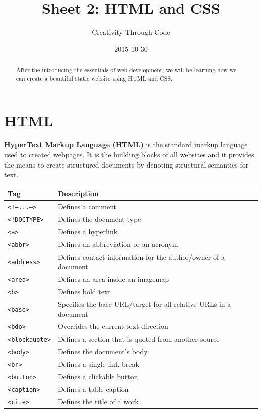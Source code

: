 \documentclass[11pt, letterpaper]{article}
\title{Sheet 2: HTML and CSS}
\date{2015-10-30}
\author{Creativity Through Code}
\begin{document}
	\maketitle
	\newpage
	\begin{abstract}
		After the introducing the essentials of web development, we will be learning how we can create a beautiful static website using HTML and CSS.
	\end{abstract}
	\section{HTML}
		\textbf{HyperText Markup Language (HTML)} is the standard markup language used to created webpages. It is the building blocks of all websites and it provides the means to create structured documents by denoting structural semantics for text.
		\begin{longtable}{l l}
			\toprule
			Tag & Description \\\midrule
			\texttt{<!---...--->} & Defines a comment \\\midrule
			\texttt{<!DOCTYPE>} & Defines the document type \\\midrule
			\texttt{<a>} & Defines a hyperlink \\\midrule
			\texttt{<abbr>} & Defines an abbreviation or an acronym \\\midrule
			\texttt{<address>} & Defines contact information for the author/owner of a document \\\midrule
			\texttt{<area>} & Defines an area inside an image­map \\\midrule
			\texttt{<b>} & Defines bold text \\\midrule
			\texttt{<base>} & Specifies the base URL/target for all relative URLs in a document \\\midrule
			\texttt{<bdo>} & Overrides the current text direction \\\midrule
			\texttt{<blockquote>} & Defines a section that is quoted from another source \\\midrule
			\texttt{<body>} & Defines the document's body \\\midrule
			\texttt{<br>} & Defines a single link break \\\midrule
			\texttt{<button>} & Defines a clickable button \\\midrule
			\texttt{<caption>} & Defines a table caption \\\midrule
			\texttt{<cite>} & Defines the title of a work\\\midrule

\end{longtable}
\end{document}
